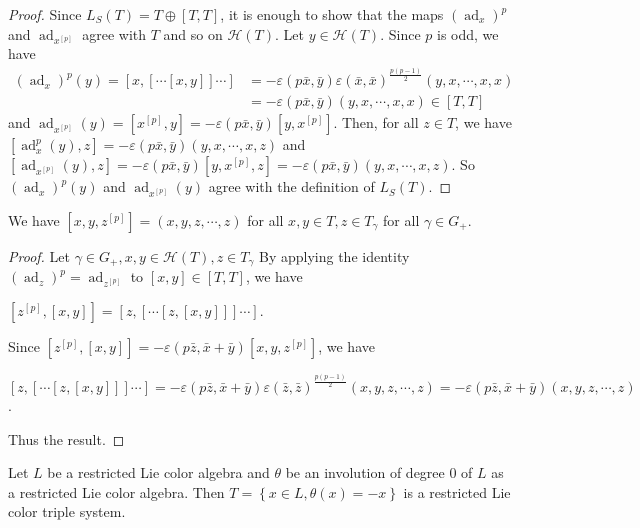 \documentclass[11pt, twoside]{article}
\DeclareMathOperator{\ad}{ad}
\begin{document}
\begin{proof}
    Since $L_S(T)= T\oplus [T,T] $, it is enough to show that the maps $(\ad_x)^p $ and $\ad_{x^{[p]}} $ agree with $T$ and so on $\mathcal{H}(T) $. Let $y\in \mathcal{H}(T)$. Since $p $ is odd, we have \begin{align*}
        (\ad_x)^p(y)= [x,[\cdots[x,y]]\cdots]&= -\varepsilon(p\bar{x},\bar{y})\varepsilon(\bar{x},\bar{x})^{\frac{p(p-1)}{2}}(y,x,\cdots,x,x) \\ &= -\varepsilon(p\bar{x},\bar{y})(y,x,\cdots,x,x) \in [T,T]
    \end{align*} and  $\ad_{x^{[p]}}(y)= [x^{[p]},y]= -\varepsilon(p\bar{x},\bar{y})[y,x^{[p]}] $. Then, for all $z\in T$, we have $[\ad_x^p(y),z]= -\varepsilon(p\bar{x},\bar{y})(y,x,\cdots,x,z) $ and $[\ad_{x^{[p]}}(y),z]= -\varepsilon(p\bar{x},\bar{y})[y,x^{[p]},z]= -\varepsilon(p\bar{x},\bar{y})(y,x,\cdots,x,z) $. So $(\ad_x)^p(y)$ and $\ad_{x^{[p]}}(y) $ agree with the  definition of $L_S(T)$.
\end{proof}

\begin{cor}
   We have $[x,y,z^{[p]}]=(x,y,z,\cdots,z) $ for all $x,y\in T, z\in T_\gamma$ for all $\gamma \in G_+$.
\end{cor}

\begin{proof}
Let $\gamma\in G_+, x,y\in \mathcal{H}(T), z\in T_\gamma $
    By applying the identity $(\ad_z)^p=\ad_{z^{[p]}} $ to $[x,y]\in [T,T] $, we have \begin{center}
        $[z^{[p]},[x,y]]=[z,[\cdots[z,[x,y]]]\cdots] $.
    \end{center} Since $[z^{[p]},[x,y]]= -\varepsilon(p\bar{z},\bar{x}+\bar{y})[x,y,z^{[p]}] $, we have \begin{center}
        $[z,[\cdots[z,[x,y]]]\cdots]= -\varepsilon(p\bar{z},\bar{x}+\bar{y})\varepsilon(\bar{z},\bar{z})^{\frac{p(p-1)}{2}}(x,y,z,\cdots,z)=  -\varepsilon(p\bar{z},\bar{x}+\bar{y})(x,y,z,\cdots,z)$.
    \end{center} Thus the result.
\end{proof}

\begin{prop}
    Let $L$ be a restricted Lie color algebra and $\theta$ be an involution of degree $0$ of $L$ as a restricted Lie color algebra. Then $T=\left\{x \in L, \theta(x)=-x \right\} $ is a restricted Lie color triple system.
\end{prop}
\end{document}
